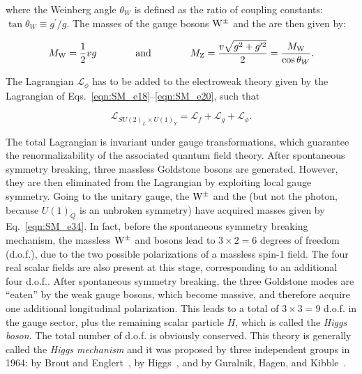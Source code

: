 \noindent where the Weinberg angle $\theta_W$ is defined as the ratio of coupling constants: $\tan\theta_W \equiv g^\prime/g$.
The masses of the gauge bosons $\mathrm{W}^\pm$ and the \PZ are then given by:

\begin{equation}\label{eqn:SM_e34}
M_\mathrm{W} = \frac{1}{2}vg \qquad\qquad \mbox{and} \qquad\qquad M_\mathrm{Z} = \frac{v\sqrt{g^2 + g^{\prime 2}}}{2} = \frac{M_\mathrm{W}}{\cos\theta_W}.
\end{equation}

The Lagrangian $\mathcal{L}_\phi$ has to be added to the electroweak theory given by the Lagrangian of Eqs.~\ref{eqn:SM_e18}--\ref{eqn:SM_e20}, such that

\begin{equation}\label{eqn:SM_e35}
\mathcal{L}_{SU(2)_L \times U(1)_Y} = \mathcal{L}_f + \mathcal{L}_g + \mathcal{L}_\phi.
\end{equation}

The total Lagrangian is invariant under gauge transformations, which guarantee the renormalizability of the associated quantum field theory.
After spontaneous symmetry breaking, three massless Goldstone bosons are generated. However, they are then eliminated from the Lagrangian by exploiting local gauge symmetry.
Going to the unitary gauge, the $\mathrm{W}^\pm$ and the \PZ (but not the photon, because $U(1)_Q$ is an unbroken symmetry) have acquired masses given by Eq.~\ref{eqn:SM_e34}.
In fact, before the spontaneous symmetry breaking mechanism, the massless $\mathrm{W}^\pm$ and \PZ bosons lead to $3\times2 = 6$ degrees of freedom (d.o.f.), due to the two possible polarizations of a massless spin-1 field.
The four real scalar fields are also present at this stage, corresponding to an additional four d.o.f..
After spontaneous symmetry breaking, the three Goldstone modes are ``eaten'' by the weak gauge bosons, which become massive, and therefore acquire one additional longitudinal polarization.
This leads to a total of $3 \times 3 = 9$ d.o.f. in the gauge sector, plus the remaining scalar particle $H$, which is called the \textit{Higgs boson}. The total number of d.o.f. is obviously conserved.
This theory is generally called the \textit{Higgs mechanism} and it was proposed by three independent groups in 1964: by Brout and Englert~\cite{PhysRevLett.13.321}, by Higgs~\cite{Higgs1964132,PhysRevLett.13.508,PhysRev.145.1156}, and by Guralnik, Hagen, and Kibble~\cite{PhysRevLett.13.585}.

